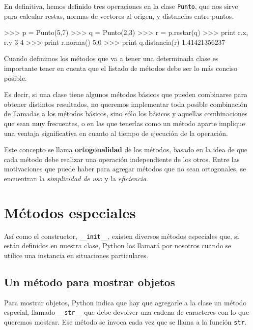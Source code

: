 En definitiva, hemos definido tres operaciones en la clase
\lstinline!Punto!, que nos sirve para calcular restas, normas de vectores
al origen, y distancias entre puntos.

\begin{codigo-python-sn}
>>> p = Punto(5,7)
>>> q = Punto(2,3)
>>> r = p.restar(q)
>>> print r.x, r.y
3 4
>>> print r.norma()
5.0
>>> print q.distancia(r)
1.41421356237
\end{codigo-python-sn}

\begin{atencion}
Cuando definimos los métodos que va a tener una determinada clase es
importante tener en cuenta que el listado de métodos debe ser lo más
conciso posible.

Es decir, si una clase tiene algunos métodos básicos que pueden combinarse
para obtener distintos resultados, no queremos implementar toda posible
combinación de llamadas a los métodos básicos, sino sólo los básicos y
aquellas combinaciones que sean muy frecuentes, o en las que
tenerlas como un método aparte implique una ventaja significativa en cuanto
al tiempo de ejecución de la operación.

Este concepto se llama {\bf ortogonalidad} de los métodos, basado en la
idea de que cada método debe realizar una operación independiente de los
otros.  Entre las motivaciones que puede haber para agregar métodos que no
sean ortogonales, se encuentran la {\it simplicidad de uso} y la {\it
eficiencia}.
\end{atencion}

\section{Métodos especiales}

Así como el constructor, \lstinline!__init__!, existen diversos métodos
especiales que, si están definidos en nuestra clase, Python los llamará por
nosotros cuando se utilice una instancia en situaciones particulares.

\subsection{Un método para mostrar objetos}

Para mostrar objetos, Python indica que hay que agregarle a la clase un
método especial, llamado \lstinline+__str__+ que debe devolver una cadena
de caracteres con lo que queremos mostrar. Ese método se invoca cada vez
que se llama a la función \lstinline!str!.

